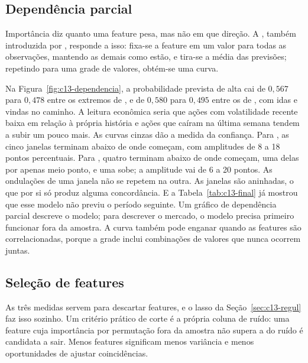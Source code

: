 \subsection{Dependência parcial}

Importância diz quanto uma feature pesa, mas não em que direção. A , também introduzida por \citet{friedman2001}, responde a isso: fixa-se a feature em um valor para todas as observações, mantendo as demais como estão, e tira-se a média das previsões; repetindo para uma grade de valores, obtém-se uma curva.


Na Figura~\ref{fig:c13-dependencia}, a probabilidade prevista de alta cai de $0,567$ para $0,478$ entre os extremos de , e de $0,580$ para $0,495$ entre os de , com idas e vindas no caminho. A leitura econômica seria que ações com volatilidade recente baixa em relação à própria história e ações que caíram na última semana tendem a subir um pouco mais. As curvas cinzas dão a medida da confiança. Para , as cinco janelas terminam abaixo de onde começam, com amplitudes de 8 a 18 pontos percentuais. Para , quatro terminam abaixo de onde começam, uma delas por apenas meio ponto, e uma sobe; a amplitude vai de 6 a 20 pontos. As ondulações de uma janela não se repetem na outra. As janelas são aninhadas, o que por si só produz alguma concordância. E a Tabela~\ref{tab:c13-final} já mostrou que esse modelo não previu o período seguinte. Um gráfico de dependência parcial descreve o modelo; para descrever o mercado, o modelo precisa primeiro funcionar fora da amostra. A curva também pode enganar quando as features são correlacionadas, porque a grade inclui combinações de valores que nunca ocorrem juntas.

\subsection{Seleção de features}

As três medidas servem para descartar features, e o lasso da Seção~\ref{sec:c13-regul} faz isso sozinho. Um critério prático de corte é a própria coluna de ruído: uma feature cuja importância por permutação fora da amostra não supera a do ruído é candidata a sair. Menos features significam menos variância e menos oportunidades de ajustar coincidências.

